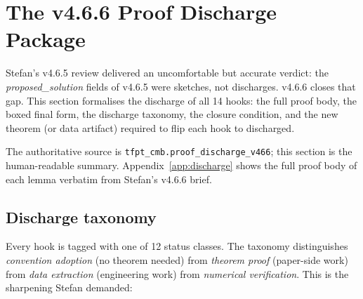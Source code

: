 \section{The v4.6.6 Proof Discharge Package}
\label{sec:discharge}

Stefan's v4.6.5 review delivered an uncomfortable but accurate verdict:
the \emph{proposed\_solution} fields of v4.6.5 were sketches, not
discharges.  v4.6.6 closes that gap.  This section formalises the
discharge of all 14 hooks: the full proof body, the boxed final form,
the discharge taxonomy, the closure condition, and the new theorem (or
data artifact) required to flip each hook to \textsf{discharged}.

The authoritative source is
\texttt{tfpt\_cmb.proof\_discharge\_v466}; this section is the
human-readable summary.  Appendix~\ref{app:discharge} shows the full
proof body of each lemma verbatim from Stefan's v4.6.6 brief.

\subsection{Discharge taxonomy}

Every hook is tagged with one of 12 status classes.  The taxonomy
distinguishes \emph{convention adoption} (no theorem needed) from
\emph{theorem proof} (paper-side work) from \emph{data extraction}
(engineering work) from \emph{numerical verification}.  This is the
sharpening Stefan demanded:

